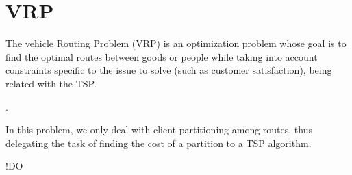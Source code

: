 \section{\texorpdfstring{\Acrlong*{VRP}}{Vehicle routing problem}} \label{algorithm-vrp}
The vehicle Routing Problem (VRP) is an optimization problem whose goal is to find the optimal routes between goods or people while taking into account constraints specific to the issue to solve (such as customer satisfaction),
being related with the TSP.




\par.\par
In this problem, we only deal with client partitioning among routes, thus delegating the task of finding the cost of a partition to a \acrshort{TSP} algorithm.\par
!DO



